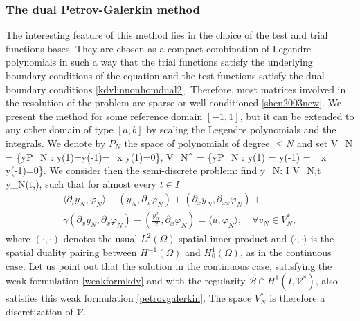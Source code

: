 \subsubsection{The dual Petrov-Galerkin method}
The interesting feature of this method lies in the choice of the test and trial functions bases. They are chosen as a compact combination of Legendre polynomials in such a way that the trial functions satisfy the underlying boundary conditions of the equation and the test functions satisfy the dual boundary conditions \eqref{kdvlinnonhomdual2}. Therefore, most matrices involved in the resolution of the problem are sparse or well-conditioned \ref{shen2003new}. We present the method for some reference domain $[-1,1]$, but it can be extended to any other domain of type $[a,b]$ by scaling the Legendre polynomials and the integrals. We denote by $P_N$ the space of polynomials of degree $\leq N$ and set
\be
V_N = \left\{y\in P_N : y(1)=y(-1)=\partial_x y(1)=0\right\},
\ee
\be
V_N^{\ast} = \left\{y\in P_N : y(1) = y(-1) = \partial_x y(-1)=0\right\}.
\ee
We consider then the semi-discrete problem: find
\be\nonumber
y_N: \quad I \rightarrow V_N,\quad t \mapsto y_N(t,\cdot),
\ee
such that for almost every $t\in I$
\begin{multline}
\langle\partial_t y_N , \varphi_N\rangle - \left( y_N, \partial_x \varphi_N \right) + \left(\partial_x y_N, \partial_{xx}\varphi_N \right)  + \\ \gamma \left( \partial_x y_N, \partial_x \varphi_N \right)- \left(\frac{y_N^2}{2}, \partial_x \varphi_N\right)= \langle u, \varphi_N\rangle, \quad \forall v_N \in V_N^{\ast},
\label{petrovgalerkin}
\end{multline}
where $\left( \cdot, \cdot \right)$ denotes the usual $L^2(\Omega)$ spatial inner product and $\langle \cdot, \cdot \rangle$ is the spatial duality pairing between $H^{-1}(\Omega)$ and $H^1_0(\Omega)$, as in the continuous case. Let us point out that the solution in the continuous case, satisfying the weak formulation \eqref{weakformkdv} and with the regularity $\mathcal{B}\cap H^1(I,\mathcal{V}^*)$, also satisfies this weak formulation \eqref{petrovgalerkin}. The space $V_N^*$ is therefore a discretization of $\mathcal{V}$.


